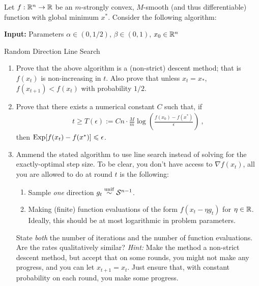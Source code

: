 \documentclass[12pt]{article}
\begin{document}
	Let $f: \mathbb{R}^n \to \mathbb{R}$ be an $m$-strongly convex, $M$-smooth (and thus differentiable) function with global minimum $x^*$. 
%
	Consider the following algorithm:

	\begin{algorithm}[H]
	\SetAlgoLined
	\textbf{Input:} Parameters $\alpha \in (0,1/2)$, $\beta \in (0,1)$, $x_0 \in \mathbb{R}^n$\;
	\caption{Random Direction Line Search}
	\end{algorithm}

\begin{enumerate}
	\item Prove that the above algorithm is a (non-strict) descent method; that is $f(x_t)$ is non-increasing in $t$. Also prove that unless $x_t = x_*$, $f(x_{t+1}) < f(x_t)$ with probability $1/2$. 
	\item Prove that there exists a numerical constant $C$ such that, if 
	\begin{eqnarray}
	t \ge T(\epsilon) := C n \cdot \frac{M}{m} \log (\frac{f(x_0) - f(x^*)}{\epsilon})~,
	\end{eqnarray}
	then $\mathrm{Exp}[f(x_t) - f(x^*)] \leqslant \epsilon$. 
	\item Ammend the stated algorithm to use line search instead of solving for the exactly-optimal step size. To be clear, you don't have access to $\nabla f(x_t)$, all you are allowed to do at round $t$ is the following:
	\begin{enumerate}
		\item Sample \emph{one} direction $g_t \overset{\mathrm{unif}}{\sim} {\cal S}^{n-1}$.
		\item Making (finite) function evaluations of the form $f(x_t - \eta g_t)$ for $\eta \in \mathbb{R}$. Ideally, this should be at most logarithmic in problem parameters.
	\end{enumerate}
	State \emph{both} the number of iterations and the number of function evaluations. Are the rates qualitatively similar? \emph{Hint:} Make the method a non-strict descent method, but accept that on some rounds, you might not make any progress, and you can let $x_{t+1} = x_t$. Just ensure that, with constant probability on each round, you make some progress. 
\end{enumerate}
\end{document}
